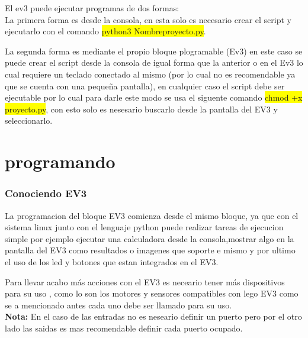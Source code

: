 \documentclass{beamer}
\begin{document}
\newpage
\begin{frame}
El ev3 puede ejecutar programas de dos formas:\\ \vspace{5mm}
La primera forma es desde la consola, en esta solo es necesario crear el script y ejecutarlo con el comando \colorbox{yellow}{python3 Nombreproyecto.py}.\\
\end{frame}

\newpage
\begin{frame}
La segunda forma es mediante el propio bloque plogramable (Ev3) en este caso se puede crear el script desde la consola de igual forma que la anterior o en el Ev3 lo cual requiere un teclado conectado al mismo (por lo cual no es recomendable ya que se cuenta con una pequeña pantalla), en cualquier caso el script debe ser ejecutable por lo cual para darle este modo se usa el siguente comando \colorbox{yellow}{chmod +x proyecto.py}, con esto solo es nesesario buscarlo desde la pantalla del EV3 y seleccionarlo.\\
\end{frame}

\newpage
\section{programando}
\begin{frame}\frametitle{Conociendo EV3}
La programacion del bloque EV3 comienza desde el mismo bloque, ya que con el sistema linux junto con el lenguaje python puede realizar tareas de ejecucion simple por ejemplo ejecutar una calculadora desde la consola,mostrar algo en la pantalla del EV3 como resultados o imagenes que soporte e mismo y por ultimo el uso de los led y botones que estan integrados en el EV3.
\end{frame}

\newpage
\begin{frame}
Para llevar acabo más acciones con el EV3 es neceario tener más dispositivos para su uso , como lo son los motores y sensores compatibles con lego EV3 como se a mencionado antes cada uno debe ser llamado para su uso.\\
\textbf{Nota:} En el caso de las entradas no es neseario definir un puerto pero por el otro lado las saidas es mas recomendable definir cada puerto ocupado.
\end{frame}

\newpage
\end{document}
